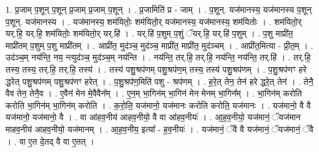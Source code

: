\documentclass[17pt]{extarticle}
\begin{document}
1. प्र॒जाम् प॒शून् प॒शून् प्र॒जाम् प्र॒जाम् प॒शून् । . प्र॒जामिति॑ प्र - जाम् । . प॒शून्. यज॑मानस्य॒ यज॑मानस्य प॒शून् प॒शून्. यज॑मानस्य । . यज॑मानस्य॒ शम॑यितोः॒ शम॑यितो॒र् यज॑मानस्य॒ यज॑मानस्य॒ शम॑यितोः । . शम॑यितो॒र् यर्.हि॒ यर्.हि॒ शम॑यितोः॒ शम॑यितो॒र् यर्.हि॑ । . यर्.हि॑ प॒शुम् प॒शुं ॅयर्.हि॒ यर्.हि॑ प॒शुम् । . प॒शु माप्री॑त॒ माप्री॑तम् प॒शुम् प॒शु माप्री॑तम् । . आप्री॑त॒ मुद॑ञ्च॒ मुद॑ञ्च॒ माप्री॑त॒ माप्री॑त॒ मुद॑ञ्चम् । . आप्री॑त॒मित्या - प्री॒त॒म् । . उद॑ञ्च॒म् नय॑न्ति॒ नय॒ न्त्युद॑ञ्च॒ मुद॑ञ्च॒म् नय॑न्ति । . नय॑न्ति॒ तर्.हि॒ तर्.हि॒ नय॑न्ति॒ नय॑न्ति॒ तर्.हि॑ । . तर्.हि॒ तस्य॒ तस्य॒ तर्.हि॒ तर्.हि॒ तस्य॑ । . तस्य॑ पशु॒श्रप॑णम् पशु॒श्रप॑ण॒म् तस्य॒ तस्य॑ पशु॒श्रप॑णम् । . प॒शु॒श्रप॑णꣳ हरे द्धरेत् पशु॒श्रप॑णम् पशु॒श्रप॑णꣳ हरेत् । . प॒शु॒श्रप॑ण॒मिति॑ पशु - श्रप॑णम् । . ह॒रे॒त् तेन॒ तेन॑ हरे द्धरे॒त् तेन॑ । . तेनै॒ वैव तेन॒ तेनै॒व । . ए॒वैन॑ मेन मे॒वैवैन᳚म् । . ए॒न॒म् भा॒गिन॑म् भा॒गिन॑ मेन मेनम् भा॒गिन᳚म् । . भा॒गिन॑म् करोति करोति भा॒गिन॑म् भा॒गिन॑म् करोति । . क॒रो॒ति॒ यज॑मानो॒ यज॑मानः करोति करोति॒ यज॑मानः । . यज॑मानो॒ वै वै यज॑मानो॒ यज॑मानो॒ वै । . वा आ॑हव॒नीय॑ आहव॒नीयो॒ वै वा आ॑हव॒नीयः॑ । . आ॒ह॒व॒नीयो॒ यज॑मानं॒ ॅयज॑मान माहव॒नीय॑ आहव॒नीयो॒ यज॑मानम् । . आ॒ह॒व॒नीय॒ इत्या᳚ - ह॒व॒नीयः॑ । . यज॑मानं॒ ॅवै वै यज॑मानं॒ ॅयज॑मानं॒ ॅवै । . वा ए॒त दे॒तद् वै वा ए॒तत् । \newline
\end{document}
